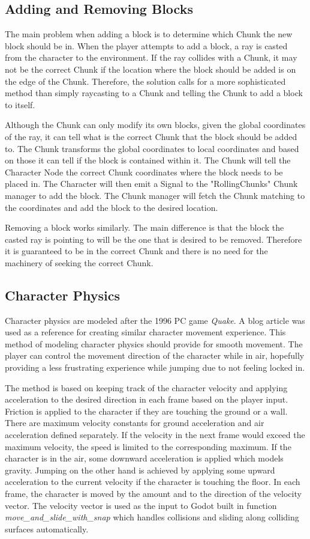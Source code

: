 \documentclass{report}
\begin{document}
\subsection{Adding and Removing Blocks}
The main problem when adding a block is to determine which Chunk the new block should be in. When the player attempts to add a block, a ray is casted from the character to the environment. If the ray collides with a Chunk, it may not be the correct Chunk if the location where the block should be added is on the edge of the Chunk. Therefore, the solution calls for a more sophisticated method than simply raycasting to a Chunk and telling the Chunk to add a block to itself.\par
Although the Chunk can only modify its own blocks, given the global coordinates of the ray, it can tell what is the correct Chunk that the block should be added to. The Chunk transforms the global coordinates to local coordinates and based on those it can tell if the block is contained within it. The Chunk will tell the Character Node the correct Chunk coordinates where the block needs to be placed in. The Character will then emit a Signal to the "RollingChunks" Chunk manager to add the block. The Chunk manager will fetch the Chunk matching to the coordinates and add the block to the desired location.\par
Removing a block works similarly. The main difference is that the block the casted ray is pointing to will be the one that is desired to be removed. Therefore it is guaranteed to be in the correct Chunk and there is no need for the machinery of seeking the correct Chunk.
\subsection{Character Physics}
Character physics are modeled after the 1996 PC game \textit{Quake}\cite{quake}. A blog article\cite{strafe} was used as a reference for creating similar character movement experience. This method of modeling character physics should provide for smooth movement. The player can control the movement direction of the character while in air, hopefully providing a less frustrating experience while jumping due to not feeling locked in.\par
The method is based on keeping track of the character velocity and applying acceleration to the desired direction in each frame based on the player input. Friction is applied to the character if they are touching the ground or a wall. There are maximum velocity constants for ground acceleration and air acceleration defined separately. If the velocity in the next frame would exceed the maximum velocity, the speed is limited to the corresponding maximum. If the character is in the air, some downward acceleration is applied which models gravity. Jumping on the other hand is achieved by applying some upward acceleration to the current velocity if the character is touching the floor. In each frame, the character is moved by the amount and to the direction of the velocity vector. The velocity vector is used as the input to Godot built in function \textit{move\_and\_slide\_with\_snap} which handles collisions and sliding along colliding surfaces automatically.
\end{document}
